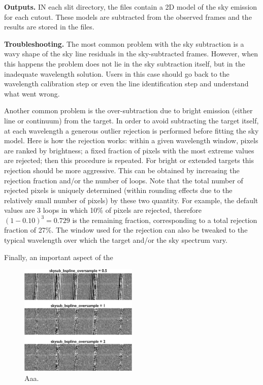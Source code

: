 \documentclass[a4paper]{article}
\begin{document}
\begin{sloppypar}
\medskip
\noindent
\textbf{Outputs.} IN each slit directory, the  files contain a 2D model of the sky emission for each cutout. These models are subtracted from the observed frames and the results are stored in the  files.


\medskip
\noindent
\textbf{Troubleshooting.} The most common problem with the sky subtraction is a wavy shape of the sky line residuals in the sky-subtracted frames. However, when this happens the problem does not lie in the sky subtraction itself, but in the inadequate wavelength solution. Users in this case should go back to the wavelength calibration step or even the line identification step and understand what went wrong.

Another common problem is the over-subtraction due to bright emission (either line or continuum) from the target. In order to avoid subtracting the target itself, at each wavelength a generous outlier rejection is performed before fitting the sky model. Here is how the rejection works: within a given wavelength window, pixels are ranked by brightness; a fixed fraction of pixels with the most extreme values are rejected; then this procedure is repeated. For bright or extended targets this rejection should be more aggressive. This can be obtained by increasing the rejection fraction and/or the number of loops. Note that the total number of rejected pixels is uniquely determined (within rounding effects due to the relatively small number of pixels) by these two quantity. For example, the default values are 3 loops in which 10\% of pixels are rejected, therefore $(1-0.10)^3=0.729$ is the remaining fraction, corresponding to a total rejection fraction of 27\%. The window used for the rejection can also be tweaked to the typical wavelength over which the target and/or the sky spectrum vary.

Finally, an important aspect of the


\begin{figure}[tbp]
\centering
\includegraphics[width=0.5\textwidth]{oversample}
\caption{Aaa.}
\label{fig:ovsersample}
\end{figure}



\end{sloppypar}
\end{document}
